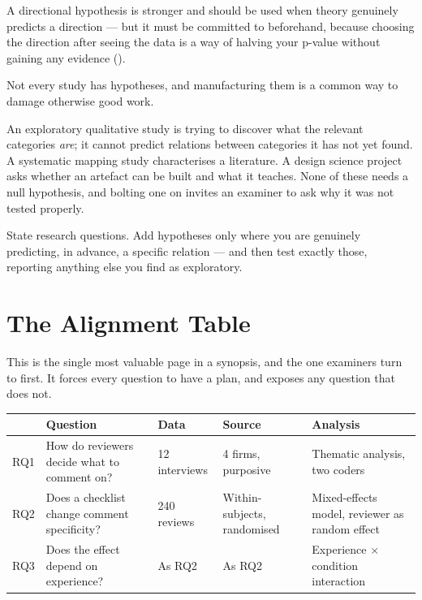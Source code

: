 A directional hypothesis is stronger and should be used when theory genuinely
predicts a direction --- but it must be committed to beforehand, because
choosing the direction after seeing the data is a way of halving your p-value
without gaining any evidence ().

\begin{alertbox}
Not every study has hypotheses, and manufacturing them is a common way to
damage otherwise good work.

\medskip
An exploratory qualitative study is trying to discover what the relevant
categories \emph{are}; it cannot predict relations between categories it has
not yet found. A systematic mapping study characterises a literature. A design
science project asks whether an artefact can be built and what it teaches.
None of these needs a null hypothesis, and bolting one on invites an examiner
to ask why it was not tested properly.

\medskip
State research questions. Add hypotheses only where you are genuinely
predicting, in advance, a specific relation --- and then test exactly those,
reporting anything else you find as exploratory.
\end{alertbox}

\section{The Alignment Table}

This is the single most valuable page in a synopsis, and the one examiners turn
to first. It forces every question to have a plan, and exposes any question
that does not.

\begin{center}
\small
\begin{tabular}{@{}L{0.7cm}L{3.4cm}L{2.6cm}L{3.2cm}L{3.4cm}@{}}
\toprule
 & \textbf{Question} & \textbf{Data} & \textbf{Source} & \textbf{Analysis} \\
\midrule
RQ1 & How do reviewers decide what to comment on?
    & 12 interviews
    & 4 firms, purposive
    & Thematic analysis, two coders \\
RQ2 & Does a checklist change comment specificity?
    & 240 reviews
    & Within-subjects, randomised
    & Mixed-effects model, reviewer as random effect \\
RQ3 & Does the effect depend on experience?
    & As RQ2
    & As RQ2
    & Experience $\times$ condition interaction \\
\bottomrule
\end{tabular}
\end{center}

